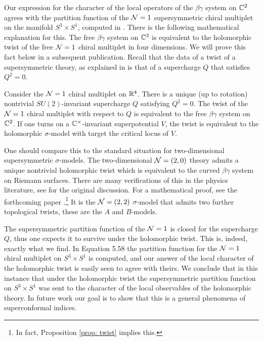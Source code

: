 \documentclass[10pt]{amsart}
\begin{document}
Our expression for the character of the local operators of the $\beta\gamma$ system on $\mathbb C^2$ agrees with the partition function of the $\mathcal N = 1$ supersymmetric chiral multiplet on the manifold $S^3 \times S^1$, computed in \cite{Closset1}.
There is the following mathematical explanation for this.
The free $\beta\gamma$ system on $\mathbb C^2$ is equivalent to the holomorphic twist of the free $\mathcal N=1$ chiral multiplet in four dimensions. 
We will prove this fact below in a subsequent publication.
Recall that the data of a twist of a supersymmetric theory, as explained in \cite{CostelloHolomorphic} is that of a supercharge $Q$ that satisfies $Q^2 = 0$. 

\begin{prop}\label{prop: twist}
Consider the $\mathcal N = 1$ chiral multiplet on $\mathbb R^4$.
There is a unique (up to rotation) nontrivial $SU(2)$-invariant supercharge $Q$ satisfying $Q^2 = 0$. 
The twist of the $\mathcal N=1$ chiral multiplet with respect to $Q$ is equivalent to the free $\beta\gamma$ system on $\mathbb C^2$.
If one turns on a $\mathbb C^\times$-invariant superpotential $V$, the twist is equivalent to the holomorphic $\sigma$-model with target the critical locus of $V$.
\end{prop}

\begin{rmk}
One should compare this to the standard situation for two-dimensional supersymmetric $\sigma$-models.
The two-dimensional $\mathcal N = (2,0)$ theory admits a unique nontrivial holomorphic twist which is equivalent to the curved $\beta\gamma$ system on Riemann surfaces. 
There are many verifications of this in the physics literature, see \cite{WittenCDO} for the original discussion. 
For a mathematical proof, see the forthcoming paper \cite{GSW}.\footnote{In fact, Proposition \ref{prop: twist} implies this.}
It is the $\mathcal N = (2,2)$ $\sigma$-model that admits two further topological twists, these are the $A$ and $B$-models.
\end{rmk}

The supersymmetric partition function of the $\mathcal N=1$ is closed for the supercharge $Q$, thus one expects it to survive under the holomorphic twist.
This is, indeed, exactly what we find.
In \cite{Closset1} Equation 5.58 the partition function for the $\mathcal N=1$ chiral multiplet on $S^3 \times S^1$ is computed, and our answer of the local character of the holomorphic twist is easily seen to agree with theirs. 
We conclude that in this instance that under the holomorphic twist the supersymmetric partition function on $S^3 \times S^1$ was sent to the character of the local observables of the holomorphic theory. 
In future work our goal is to show that this is a general phenomena of superconformal indices.
\end{document}
